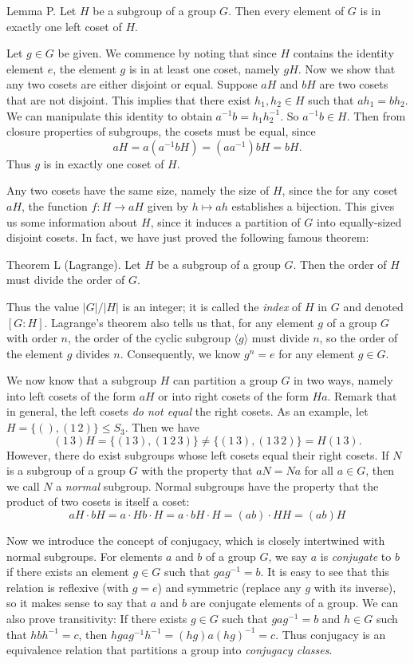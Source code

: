 \proclaim Lemma P. Let $H$ be a subgroup of a group $G$. Then every element of $G$ is in exactly one left coset of $H$.

\proof Let $g\in G$ be given. We commence by noting that since $H$ contains the identity element $e$, the element $g$ is in at least one coset, namely $gH$. Now we show that any two cosets are either disjoint or equal. Suppose $aH$ and $bH$ are two cosets that are not disjoint. This implies that there exist $h_1, h_2\in H$ such that $ah_1 = bh_2$. We can manipulate this identity to obtain $a^{-1}b = h_1h_2^{-1}$. So $a^{-1}b\in H$. Then from closure properties of subgroups, the cosets must be equal, since
$$aH = a(a^{-1}bH) = (aa^{-1})bH = bH.$$
Thus $g$ is in exactly one coset of $H$.\slug

Any two cosets have the same size, namely the size of $H$, since the for any coset $aH$, the function $f:H\rightarrow aH$ given by $h\mapsto ah$ establishes a bijection. This gives us some information about $H$, since it induces a partition of $G$ into equally-sized disjoint cosets. In fact, we have just proved the following famous theorem:

\parenproclaim Theorem L (Lagrange). Let $H$ be a subgroup of a group $G$. Then the order of $H$ must divide the order of $G$.\slug

Thus the value $|G|/|H|$ is an integer; it is called the {\it index} of $H$ in $G$ and denoted $[G:H]$. Lagrange's theorem also tells us that, for any element $g$ of a group $G$ with order $n$, the order of the cyclic subgroup $\langle g\rangle$ must divide $n$, so the order of the element $g$ divides $n$. Consequently, we know $g^n=e$ for any element $g\in G$.

We now know that a subgroup $H$ can partition a group $G$ in two ways, namely into left cosets of the form $aH$ or into right cosets of the form $Ha$. Remark that in general, the left cosets {\it do not equal} the right cosets. As an example, let $H = \{(), (1\,2)\} \leq S_3$. Then we have
$$(1\,3)H = \{(1\,3), (1\,2\,3)\} \neq \{(1\,3),(1\,3\,2)\} = H(1\,3).$$
However, there do exist subgroups whose left cosets equal their right cosets. If $N$ is a subgroup of a group $G$ with the property that $aN = Na$ for all $a\in G$, then we call $N$ a {\it normal} subgroup. Normal subgroups have the property that the product of two cosets is itself a coset:
$$aH\cdot bH = a\cdot Hb\cdot H = a \cdot bH \cdot H = (ab)\cdot HH = (ab)H$$

Now we introduce the concept of conjugacy, which is closely intertwined with normal subgroups. For elements $a$ and $b$ of a group $G$, we say $a$ is {\it conjugate} to $b$ if there exists an element $g\in G$ such that $gag^{-1} = b$. It is easy to see that this relation is reflexive (with $g=e$) and symmetric (replace any $g$ with its inverse), so it makes sense to say that $a$ and $b$ are conjugate elements of a group. We can also prove transitivity: If there exists $g\in G$ such that $gag^{-1} = b$ and $h\in G$ such that $hbh^{-1} = c$, then $hgag^{-1}h^{-1}= (hg)a(hg)^{-1} = c$. Thus conjugacy is an equivalence relation that partitions a group into {\it conjugacy classes}.

